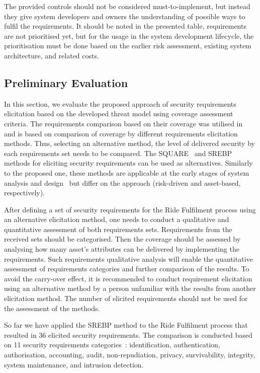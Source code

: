 \documentclass[manuscript]{acmart}
\begin{document}
The provided controls should not be considered must-to-implement, but instead they give system developers and owners the understanding of possible ways to fulfil the requirements. It should be noted in the presented table, requirements are not prioritised yet, but for the usage in the system development lifecycle, the prioritisation must be done based on the earlier risk assessment, existing system architecture, and related costs.

\subsection{Preliminary Evaluation} \label{sec:Validation}

In this section, we evaluate the proposed approach of security requirements elicitation based on the developed threat model using coverage assessment criteria. The requirements comparison based on their coverage was utilised in~\cite{ahmed2014SREBP} and is based on comparison of coverage by different requirements elicitation methods. Thus, selecting an alternative method, the level of delivered security by each requirements set needs to be compared. The SQUARE~\cite{mead2007Square} and SREBP~\cite{ahmed2014SREBP} methods for eliciting security requirements can be used as alternatives. Similarly to the proposed one, these methods are applicable at the early stages of system analysis and design~\cite{pattakou2017security} but differ on the approach (risk-driven and asset-based, respectively).

After defining a set of security requirements for the Ride Fulfilment process using an alternative elicitation method, one needs to conduct a qualitative and quantitative assessment of both requirements sets. Requirements from the received sets should be categorised. Then the coverage should be assessed by analysing how many asset's attributes can be delivered by implementing the requirements. Such requirements qualitative analysis will enable the quantitative assessment of requirements categories and further comparison of the results. To avoid the carry-over effect, it is recommended to conduct requirement elicitation using an alternative method by a person unfamiliar with the results from another elicitation method. The number of elicited requirements should not be used for the assessment of the methods.

So far we have applied the SREBP method to the Ride Fulfilment process that resulted in 36 elicited security requirements. The comparison is conducted based on 11 security requirements categories~\cite{SecReqsFiresmith}: identification, authentication, authorisation, accounting, audit, non-repudiation, privacy, survivability, integrity, system maintenance, and intrusion detection. 
\end{document}
